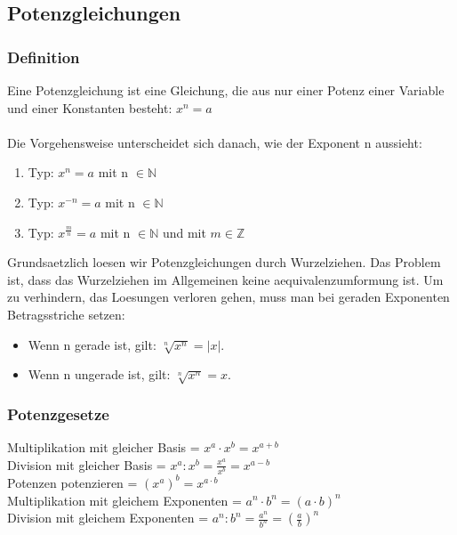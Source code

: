 \begin{multicols}{2}
    \subsection{Potenzgleichungen}
    \vspace{-4mm}
    \subsubsection{Definition}
    \vspace{-4mm}
    Eine Potenzgleichung ist eine Gleichung, die aus nur einer Potenz einer Variable und einer Konstanten besteht: $x^n = a$ \\~\\
    Die Vorgehensweise unterscheidet sich danach, wie der Exponent n aussieht:
    \begin{enumerate}
        \item Typ: $x^n = a$ mit n $\in \mathbb{N}$
        \item Typ: $x^{-n} = a$ mit n $\in \mathbb{N}$
        \item Typ: $x^{\frac{m}{n}} = a$ mit n $\in \mathbb{N}$ und mit $m \in \mathbb{Z}$
    \end{enumerate}
    Grundsaetzlich loesen wir Potenzgleichungen durch Wurzelziehen. Das Problem ist, dass das Wurzelziehen im Allgemeinen keine aequivalenzumformung ist. Um zu verhindern, das Loesungen verloren gehen, muss man bei geraden Exponenten Betragsstriche setzen:
    \begin{itemize}
        \item Wenn n gerade ist, gilt: $\sqrt[n]{x^n} = |x|$.
        \item Wenn n ungerade ist, gilt: $\sqrt[n]{x^n} = x$.
    \end{itemize}
    \subsubsection{Potenzgesetze}
    \vspace{-4mm}
    Multiplikation mit gleicher Basis = $x^a \cdot x^b = x^{a+b}$ \\
    Division mit gleicher Basis = $x^a : x^b = \frac{x^a}{x^b} = x^{a-b}$ \\
    Potenzen potenzieren = $\left(x^a\right)^b = x^{a \cdot b}$ \\
    Multiplikation mit gleichem Exponenten = $a^n \cdot b^n = \left(a \cdot b\right)^n$ \\
    Division mit gleichem Exponenten = $a^n : b^n = \frac{a^n}{b^n} = \left(\frac{a}{b}\right)^n$ \\




\end{multicols}
